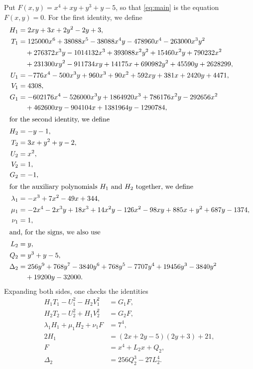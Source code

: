 \documentclass[11pt]{article}
\begin{document}
Put $F(x,y)=x^{4}+xy+y^{3}+y-5$, so that \eqref{eq:main} is the equation $F(x,y)=0$. For the first identity, we define
\begin{align*}
H_{1}&=2xy+3x+2y^{2}-2y+3,\\
T_{1}&=125000x^{6}+38088x^{5}-38088x^{4}y-478960x^{4}-263000x^{3}y^{2}\\
&\quad+276372x^{3}y-1014132x^{3}+393088x^{2}y^{2}+15460x^{2}y+790232x^{2}\\
&\quad+231300xy^{2}-911734xy+14175x+690982y^{2}+45590y+2628299,\\
U_{1}&=-776x^{4}-500x^{3}y+960x^{3}+90x^{2}+592xy+381x+2420y+4471,\\
V_{1}&=4308,\\
G_{1}&=-602176x^{4}-526000x^{3}y+1864920x^{3}+786176x^{2}y-292656x^{2}\\
&\quad+462600xy-904104x+1381964y-1290784,\\
\intertext{for the second identity, we define}
H_{2}&=-y-1,\\
T_{2}&=3x+y^{2}+y-2,\\
U_{2}&=x^{2},\\
V_{2}&=1,\\
G_{2}&=-1,\\
\intertext{for the auxiliary polynomials $H_{1}$ and $H_{2}$ together, we define}
\lambda_{1}&=-x^{3}+7x^{2}-49x+344,\\
\mu_{1}&=-2x^{4}-2x^{3}y+18x^{3}+14x^{2}y-126x^{2}-98xy+885x+y^{2}+687y-1374,\\
\nu_{1}&=1,\\
\intertext{and, for the signs, we also use}
L_{2}&=y,\\
Q_{2}&=y^{3}+y-5,\\
\Delta_{2}&=256y^{9}+768y^{7}-3840y^{6}+768y^{5}-7707y^{4}+19456y^{3}-3840y^{2}\\
&\quad+19200y-32000.
\end{align*}
Expanding both sides, one checks the identities
\begin{align}
H_{1}T_{1}-U_{1}^2-H_{2}V_{1}^2&=G_{1}F,\label{eq:norm1}\\
H_{2}T_{2}-U_{2}^2+H_{1}V_{2}^2&=G_{2}F,\label{eq:norm2}\\
\lambda_{1}H_{1}+\mu_{1}H_{2}+\nu_{1}F&=7^{4},\label{eq:cross1}\\
2H_{1}&=(2x+2y-5)(2y+3)+21,\label{eq:sign1}\\
F&=x^4+L_{2}x+Q_{2},\label{eq:sign2}\\
\Delta_{2}&=256Q_{2}^3-27L_{2}^4.\label{eq:sign2b}
\end{align}
\end{document}
